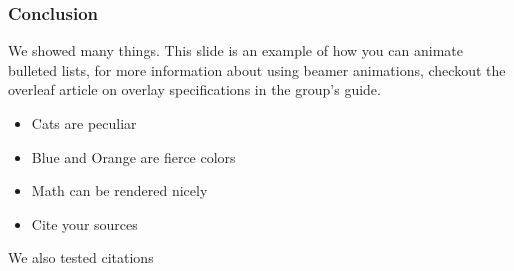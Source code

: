\begin{frame}
  \frametitle{Conclusion}
        We showed many things. This slide is an example of how 
        you can animate bulleted lists, for more information about
        using beamer animations, checkout the overleaf article on 
        overlay specifications in the group's guide.
        \begin{itemize}
                \item Cats are peculiar
                \pause
                \item Blue and Orange are fierce colors
                \pause
                \item Math can be rendered nicely
                \pause
                \item Cite your sources
        \end{itemize}


        We also tested citations \cite{mcadam_putting_2012}
\end{frame}
